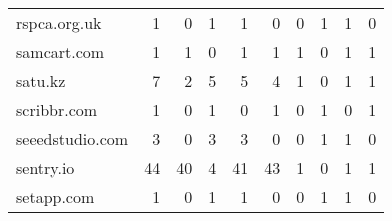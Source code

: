 \begin{tabular}{lrrrrrrrrr}
               rspca.org.uk &                                1 &                                  0 &                                      1 &                            1 &                           0 &                                   0 &                                      1 &                             1 &                            0 \\
                samcart.com &                                1 &                                  1 &                                      0 &                            1 &                           1 &                                   1 &                                      0 &                             1 &                            1 \\
                    satu.kz &                                7 &                                  2 &                                      5 &                            5 &                           4 &                                   1 &                                      0 &                             1 &                            1 \\
                scribbr.com &                                1 &                                  0 &                                      1 &                            0 &                           1 &                                   0 &                                      1 &                             0 &                            1 \\
            seeedstudio.com &                                3 &                                  0 &                                      3 &                            3 &                           0 &                                   0 &                                      1 &                             1 &                            0 \\
                  sentry.io &                               44 &                                 40 &                                      4 &                           41 &                          43 &                                   1 &                                      0 &                             1 &                            1 \\
                 setapp.com &                                1 &                                  0 &                                      1 &                            1 &                           0 &                                   0 &                                      1 &                             1 &                            0 \\

\end{tabular}
